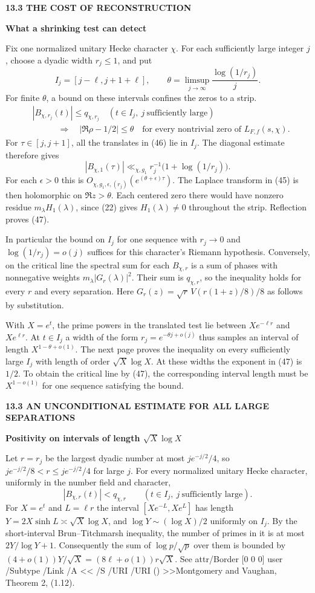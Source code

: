 \documentclass[11pt,letterpaper]{article}
\newcommand{\rightmarktext}{}
\newcommand{\printfolio}{}
\newcommand{\leaf}[4]{\clearpage\gdef\printfolio{#1}\gdef\rightmarktext{#2}%
  {\small\sffamily\bfseries\color{ink}#3\par}\vspace{3pt}%
  {\LARGE\bfseries #4\par}\vspace{5pt}}
\newcommand{\citetitle}[2]{\leavevmode\pdfstartlink attr{/Border [0 0 0]} user{%
 /Subtype /Link /A << /S /URI /URI (\pdfescapestring{\detokenize{#1}}) >>}{\color{ink}#2}\pdfendlink}
\begin{document}
\leaf{522aa}{Widths and zeros}{13.3 \quad THE COST OF RECONSTRUCTION}{What a shrinking test can detect}
Fix one normalized unitary Hecke character $\chi$. For each sufficiently
large integer $j$, choose a dyadic width $r_j\le1$, and put
\[
 I_j=[j-\ell,j+1+\ell],\qquad
 \theta=\limsup_{j\to\infty}\frac{\log(1/r_j)}{j}.
\]
For finite $\theta$, a bound on these intervals confines the zeros to a strip.
\begin{align*}
 &|B_{\chi,r_j}(t)|\le q_{\chi,r_j}
                \quad(t\in I_j,\ j\ \text{sufficiently large})\\
 &\hspace{36pt}\Longrightarrow\quad
       |\Re\rho-1/2|\le\theta
       \quad\text{for every nontrivial zero of }L_{F,f}(s,\chi).
 \tag{47}
\end{align*}
For $\tau\in[j,j+1]$, all the translates in (46) lie in $I_j$.
The diagonal estimate therefore gives
\[
 |B_{\chi,1}(\tau)|\ll_{\chi,g_1}r_j^{-1}\big(1+\log(1/r_j)\big).
\]
For each $\epsilon>0$ this is $O_{\chi,g_1,\epsilon,(r_j)}
(e^{(\theta+\epsilon)\tau})$. The Laplace transform in (45)
is then holomorphic on $\Re z>\theta$. Each centered zero there
would have nonzero residue $m_\lambda H_1(\lambda)$, since (22)
gives $H_1(\lambda)\ne0$ throughout the strip. Reflection proves (47).

In particular the bound on $I_j$ for one sequence with
$r_j\to0$ and $\log(1/r_j)=o(j)$ suffices for this character's
Riemann hypothesis. Conversely, on the critical line the spectral
sum for each $B_{\chi,r}$ is a sum of phases with nonnegative weights
$m_\lambda|G_r(\lambda)|^2$. Their sum is $q_{\chi,r}$, so the
inequality holds for every $r$ and every separation. Here
$G_r(z)=\sqrt r\,V(r(1+z)/8)/8$ as follows by substitution.

With $X=e^t$, the prime powers in the translated test lie between
$Xe^{-\ell r}$ and $Xe^{\ell r}$. At $t\in I_j$ a width of the
form $r_j=e^{-\theta j+o(j)}$ thus samples an interval of length
$X^{1-\theta+o(1)}$. The next page proves the inequality on every
sufficiently large $I_j$ with length of order $\sqrt X\log X$.
At these widths the exponent in (47) is $1/2$. To obtain the
critical line by (47), the corresponding interval length must be
$X^{1-o(1)}$ for one sequence satisfying the bound.

\leaf{522ab}{Prime intervals}{13.3 \quad AN UNCONDITIONAL ESTIMATE FOR ALL LARGE SEPARATIONS}{Positivity on intervals of length \(\sqrt X\log X\)}
Let $r=r_j$ be the largest dyadic number at most
$j e^{-j/2}/4$, so $j e^{-j/2}/8<r\le j e^{-j/2}/4$ for large $j$.
For every normalized unitary Hecke character, uniformly in the number
field and character,
\[
 |B_{\chi,r}(t)|<q_{\chi,r}\qquad(t\in I_j,\ j\ \text{sufficiently large}).
 \tag{48}
\]
For $X=e^t$ and $L=\ell r$ the interval $[Xe^{-L},Xe^L]$ has length
$Y=2X\sinh L\asymp\sqrt X\log X$, and $\log Y\sim(\log X)/2$
uniformly on $I_j$. By the short-interval Brun--Titchmarsh inequality,
the number of primes in it is at most $2Y/\log Y+1$.
Consequently the sum of $\log p/\sqrt p$ over them is bounded by
$(4+o(1))Y/\sqrt X=(8\ell+o(1))r\sqrt X$.
See \citetitle{https://doi.org/10.1112/S0025579300004708}{Montgomery and Vaughan, Theorem 2, (1.12)}.
\end{document}
